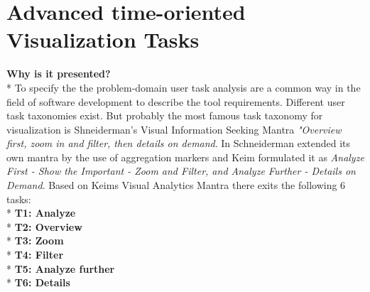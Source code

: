 \section{Advanced time-oriented Visualization Tasks}
\textbf{Why is it presented?}\\*
To specify the the problem-domain user task analysis are a common way in the field of software development to describe the tool requirements\cite{Aigner2011}. Different user task taxonomies exist\cite{paterno1997concurtasktrees, Shneiderman2008, Keim2008}. But probably the most famous task taxonomy for visualization is Shneiderman's Visual Information Seeking Mantra \textit{"Overview first, zoom in and filter, then details on demand}. In \cite{Shneiderman2008} Schneiderman extended its own mantra by the use of aggregation markers and Keim formulated it as \textit{Analyze First - Show the Important - Zoom and Filter, and Analyze Further - Details on Demand}\cite{Keima}.
Based on Keims Visual Analytics Mantra there exits the following 6 tasks: 
\\*
\textbf{T1: Analyze}
\\*
\textbf{T2: Overview}
\\*
\textbf{T3: Zoom}
\\*
\textbf{T4: Filter}
\\*
\textbf{T5: Analyze further}
\\*
\textbf{T6: Details}

